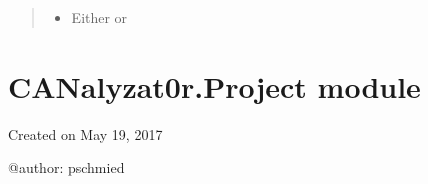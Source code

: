 \documentclass[letterpaper,10pt,english]{sphinxmanual}
\begin{document}
\begin{fulllineitems}
\begin{fulllineitems}
\begin{quote}
\begin{description}
\begin{itemize}
\item {} 
 \textendash{} Either  or 

\end{itemize}

\end{description}\end{quote}

\end{fulllineitems}


\begin{fulllineitems}
\label{\detokenize{src:src.PacketTableModel.PacketTableModel.staticMetaObject}}
\end{fulllineitems}


\end{fulllineitems}



\section{CANalyzat0r.Project module}
\label{\detokenize{src:canalyzat0r-project-module}}\label{\detokenize{src:module-src.Project}}
Created on May 19, 2017

@author: pschmied
\end{document}

